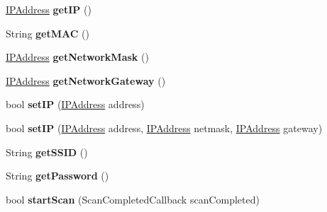 \begin{DoxyCompactItemize}
\item 
\hypertarget{class_station_class_a25875fc23dbeb4bc7c9a1a5f7fb76412}{}\hyperlink{class_i_p_address}{I\+P\+Address} {\bfseries get\+I\+P} ()\label{class_station_class_a25875fc23dbeb4bc7c9a1a5f7fb76412}

\item 
\hypertarget{class_station_class_aa83979edcf377f51ad5c6a61395a1c30}{}String {\bfseries get\+M\+A\+C} ()\label{class_station_class_aa83979edcf377f51ad5c6a61395a1c30}

\item 
\hypertarget{class_station_class_abd8b97163f6bf4dd3f0e372dfb464a37}{}\hyperlink{class_i_p_address}{I\+P\+Address} {\bfseries get\+Network\+Mask} ()\label{class_station_class_abd8b97163f6bf4dd3f0e372dfb464a37}

\item 
\hypertarget{class_station_class_a3b47d30a2dc3f191986a53a0188da4f4}{}\hyperlink{class_i_p_address}{I\+P\+Address} {\bfseries get\+Network\+Gateway} ()\label{class_station_class_a3b47d30a2dc3f191986a53a0188da4f4}

\item 
\hypertarget{class_station_class_a1a00baaffe6a6fe057c83a8074963963}{}bool {\bfseries set\+I\+P} (\hyperlink{class_i_p_address}{I\+P\+Address} address)\label{class_station_class_a1a00baaffe6a6fe057c83a8074963963}

\item 
\hypertarget{class_station_class_ad7419d830a45e093079ddad59e7b8577}{}bool {\bfseries set\+I\+P} (\hyperlink{class_i_p_address}{I\+P\+Address} address, \hyperlink{class_i_p_address}{I\+P\+Address} netmask, \hyperlink{class_i_p_address}{I\+P\+Address} gateway)\label{class_station_class_ad7419d830a45e093079ddad59e7b8577}

\item 
\hypertarget{class_station_class_ad15b66f03da67d5f3e0fe277f19b20a9}{}String {\bfseries get\+S\+S\+I\+D} ()\label{class_station_class_ad15b66f03da67d5f3e0fe277f19b20a9}

\item 
\hypertarget{class_station_class_a85c971fbafdcde8f1c77bb581319e2f2}{}String {\bfseries get\+Password} ()\label{class_station_class_a85c971fbafdcde8f1c77bb581319e2f2}

\item 
\hypertarget{class_station_class_a482f6a13867a91e3c1c1679dd333bfe9}{}bool {\bfseries start\+Scan} (Scan\+Completed\+Callback scan\+Completed)\label{class_station_class_a482f6a13867a91e3c1c1679dd333bfe9}


\end{DoxyCompactItemize}
